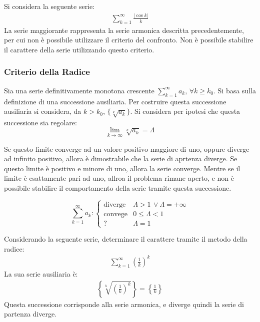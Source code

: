 \documentclass{article}
\numberwithin{equation}{subsection}
\begin{document}
Si considera la seguente serie:
\begin{gather*}
    \displaystyle\sum_{k=1}^\infty\frac{|\cos k|}{k}
\end{gather*}
La serie maggiorante rappresenta la serie armonica descritta precedentemente, per cui non è possibile utilizzare il criterio del confronto. Non è possibile stabilire il carattere della serie utilizzando questo criterio. 

\subsubsection{Criterio della Radice}

Sia una serie definitivamente monotona crescente $\sum_{k=1}^\infty a_k,\,\forall k\geq k_0$. 
Si basa sulla definizione di una successione ausiliaria. Per costruire questa successione ausiliaria si considera, da $k>k_0$, $\{\sqrt[k]{a_k}\}$. Si considera per ipotesi che questa successione sia regolare:
\begin{equation*}
    \lim_{k\to\infty}\sqrt[k]{a_k}=\Lambda
\end{equation*}

Se questo limite converge ad un valore positivo maggiore di uno, oppure diverge ad infinito positivo, allora è dimostrabile che la serie di aprtenza diverge. 
Se questo limite è positivo e minore di uno, allora la serie converge. Mentre se il limite è esattamente pari ad uno, allroa il problema rimane aperto, e non è possibile stabilire il comportamento della serie tramite questa successione. 

\begin{equation}
    \displaystyle\sum_{k=1}^\infty a_k:\begin{cases}
        \text{diverge}&\Lambda > 1\,\lor\Lambda=+\infty\\
        \text{convege}&0\leq\Lambda<1\\
        ?&\Lambda=1
    \end{cases}
\end{equation}

Considerando la seguente serie, determinare il carattere tramite il metodo della radice:
\begin{gather*}
    \displaystyle\sum_{k=1}^\infty\left(\frac{1}{k}\right)^k
\end{gather*}
La sua serie ausiliaria è:
\begin{gather*}
    \displaystyle\left\{\sqrt[k]{\left(\frac{1}{k}\right)^{k}}\right\}=\left\{\frac{1}{k}\right\}
\end{gather*}
Questa successione corrisponde alla serie armonica, e diverge quindi la serie di partenza diverge. 
\end{document}

